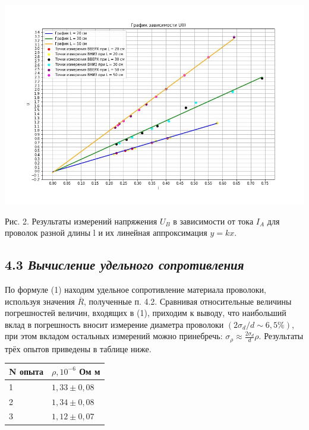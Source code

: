 \begin{center}
    {\includegraphics[width=14cm]{schedule}}
\end{center}

Рис. 2. Результаты измерений напряжения $U_B$ в зависимости от тока $I_A$ для проволок разной длины l и их линейная аппроксимация $y=kx$.\\




\subsection*{4.3 \textit{Вычисление удельного сопротивления}}




По формуле (1) находим удельное сопротивление материала проволоки, используя значения $\overline{R}$, полученные п. 4.2. Сравнивая относительные величины погрешностей величин, входящих в (1), приходим к выводу, что наибольший вклад в погрешность вносит измерение диаметра проволоки $(2\sigma_{d}/d \sim 6,5\%)$, при этом вкладом остальных измерений можно принебречь: $\sigma_{\rho} \approx \frac{2\sigma_{d}}{d}\rho$. Результаты трёх опытов приведены в таблице ниже.


\begin{table}[h]
\centering
\begin{tabular}{|l|l|}
\hline
N опыта & $\rho, 10^{-6}$ Ом м   \\ \hline
1       & $1,33 \pm 0,08$                         \\ \hline
2       & $1,34 \pm 0,08$                         \\ \hline
3       & $1,12 \pm 0,07$                         \\ \hline
\end{tabular}
\end{table}


